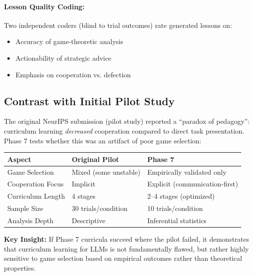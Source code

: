 \paragraph{Lesson Quality Coding:}
Two independent coders (blind to trial outcomes) rate generated lessons on:
\begin{itemize}
    \item Accuracy of game-theoretic analysis
    \item Actionability of strategic advice
    \item Emphasis on cooperation vs. defection
\end{itemize}


\subsection{Contrast with Initial Pilot Study}

The original NeurIPS submission (pilot study) reported a ``paradox of pedagogy'': curriculum learning \emph{decreased} cooperation compared to direct task presentation. Phase 7 tests whether this was an artifact of poor game selection:

\begin{center}
\begin{tabular}{lll}
\toprule
\textbf{Aspect} & \textbf{Original Pilot} & \textbf{Phase 7} \\
\midrule
Game Selection & Mixed (some unstable) & Empirically validated only \\
Cooperation Focus & Implicit & Explicit (communication-first) \\
Curriculum Length & 4 stages & 2--4 stages (optimized) \\
Sample Size & 30 trials/condition & 10 trials/condition \\
Analysis Depth & Descriptive & Inferential statistics \\
\bottomrule
\end{tabular}
\end{center}

\textbf{Key Insight:} If Phase 7 curricula succeed where the pilot failed, it demonstrates that curriculum learning for LLMs is not fundamentally flawed, but rather highly sensitive to game selection based on empirical outcomes rather than theoretical properties.
